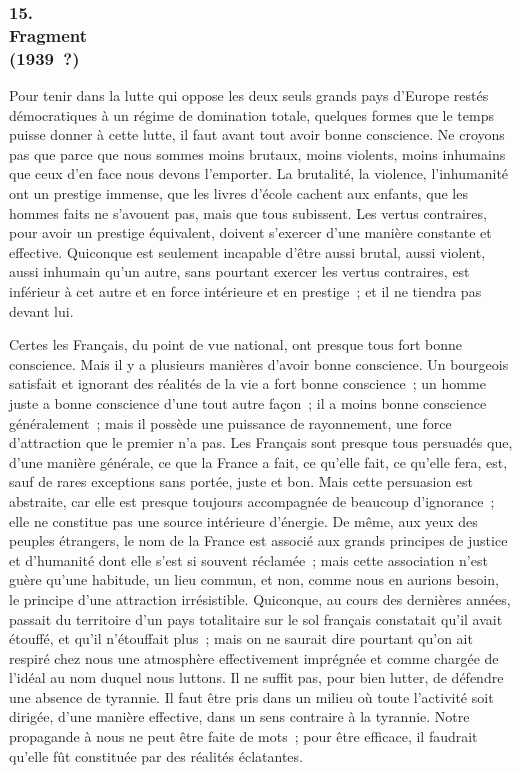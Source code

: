 \documentclass[french,twoside]{book} %
\begin{document}
\subsubsection[{15. Fragment, (1939 ?)}]{15. \\
Fragment \\
(1939 ?)}
\noindent \par
Pour tenir dans la lutte qui oppose les deux seuls grands pays d'Europe restés démocratiques à un régime de domination totale, quelques formes que le temps puisse donner à cette lutte, il faut avant tout avoir bonne conscience. Ne croyons pas que parce que nous sommes moins brutaux, moins violents, moins inhumains que ceux d'en face nous devons l'emporter. La brutalité, la violence, l'inhumanité ont un prestige immense, que les livres d'école cachent aux enfants, que les hommes faits ne s'avouent pas, mais que tous subissent. Les vertus contraires, pour avoir un prestige équivalent, doivent s'exercer d'une manière constante et effective. Quiconque est seulement incapable d'être aussi brutal, aussi violent, aussi inhumain qu'un autre, sans pourtant exercer les vertus contraires, est inférieur à cet autre et en force intérieure et en prestige ; et il ne tiendra pas devant lui.\par
Certes les Français, du point de vue national, ont presque tous fort bonne conscience. Mais il y a plusieurs manières d'avoir bonne conscience. Un bourgeois satisfait et ignorant des réalités de la vie a fort bonne conscience ; un homme juste a bonne conscience d'une tout autre façon ; il a moins bonne conscience généralement ; mais il possède une puissance de rayonnement, une force d'attraction que le premier n'a pas. Les Français sont presque tous persuadés que, d'une manière générale, ce que la France a fait, ce qu'elle fait, ce qu'elle fera, est, sauf de rares exceptions sans portée, juste et bon. Mais cette persuasion est abstraite, car elle est presque toujours accompagnée de beaucoup d'ignorance ; elle ne constitue pas une source intérieure d'énergie. De même, aux yeux des peuples étrangers, le nom de la France est associé aux grands principes de justice et d'humanité dont elle s'est si souvent réclamée ; mais cette association n'est guère qu'une habitude, un lieu commun, et non, comme nous en aurions besoin, le principe d'une attraction irrésistible. Quiconque, au cours des dernières années, passait du territoire d'un pays totalitaire sur le sol français constatait qu'il avait étouffé, et qu'il n'étouffait plus ; mais on ne saurait dire pourtant qu'on ait respiré chez nous une atmosphère effectivement imprégnée et comme chargée de l'idéal au nom duquel nous luttons. Il ne suffit pas, pour bien lutter, de défendre une absence de tyrannie. Il faut être pris dans un milieu où toute l'activité soit dirigée, d'une manière effective, dans un sens contraire à la tyrannie. Notre propa­gande à nous ne peut être faite de mots ; pour être efficace, il faudrait qu'elle fût constituée par des réalités éclatantes.\par
\end{document}
